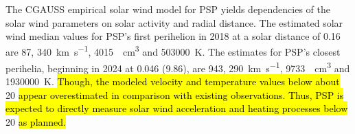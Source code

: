 {The CGAUSS empirical solar wind model for PSP yields dependencies of the solar wind parameters on solar activity and radial distance. The estimated solar wind median values for PSP’s first perihelion in 2018 at a solar distance of \SI{0.16}{\au} are \SI{87}{\nT}, \SI{340}{\km\per\s}, \SI{4015}{\per\cm\cubed} and \SI{503000}{\K}. The estimates for PSP’s closest perihelia, beginning in 2024 at \SI{0.046}{\au} (\SI{9.86}{\Rs}), are \SI{943}{\nT}, \SI{290}{\km\per\s}, \SI{9733}{\per\cm\cubed} and \SI{1930000}{\K}. \hl{Though, the modeled velocity and temperature values below about } \SI{20}{\Rs} \hl{appear overestimated in comparison with existing observations. Thus, PSP is expected to directly measure solar wind acceleration and heating processes below } \SI{20}{\Rs} \hl{as planned. } }	%
{}	%


\maketitle





